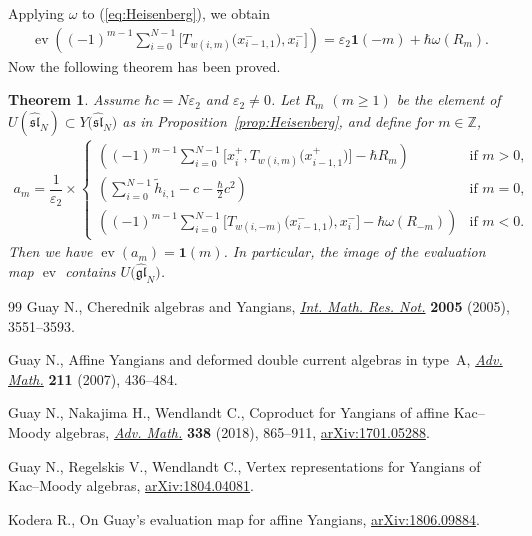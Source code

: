 \documentclass[11pt]{article}
\newtheorem{thm}{Theorem}[section]
\theoremstyle{definition}
\numberwithin{equation}{section}
\DeclareMathOperator{\ev}{ev}
\newcommand{\ve}{\varepsilon}
\newcommand{\bbZ}{\mathbb{Z}}
\newcommand{\affY}{Y\big(\affsl\big)}
\newcommand{\gl}{\mathfrak{gl}}
\newcommand{\affsl}{\hat{\mathfrak{sl}}_N}
\newcommand{\bfid}{\mathbf{1}}
\begin{document}
Applying $\omega$ to (\ref{eq:Heisenberg}), we obtain
\begin{gather*}
\ev\left( (-1)^{m-1} \sum_{i=0}^{N-1} \big[T_{w(i,m)}\big(x_{i-1,1}^-\big), x_{i}^-\big] \right) = \ve_2 \bfid(-m) + \hbar \omega(R_m).
\end{gather*}
Now the following theorem has been proved.
\begin{thm}\label{thm:image}Assume $\hbar c =N\ve_2$ and $\ve_2 \neq 0$. Let $R_m$ $(m \geq 1)$ be the element of $U(\hat{\mathfrak{sl}}_N) \subset \affY$ as in Proposition~{\rm \ref{prop:Heisenberg}}, and define for $m \in \bbZ$,
\begin{gather*}
a_{m} = \dfrac{1}{\ve_2} \times \begin{cases}
\displaystyle \left( (-1)^{m-1} \sum_{i=0}^{N-1} \big[x_{i}^+, T_{w(i,m)}\big(x_{i-1,1}^+\big)\big] - \hbar R_m\right) & \text{if $m>0$},\\
\displaystyle \left( \sum_{i=0}^{N-1} \tilde{h}_{i,1} - c - \tfrac{\hbar}{2} c^2\right) & \text{if $m=0$},\\
\displaystyle \left((-1)^{m-1} \sum_{i=0}^{N-1} \big[T_{w(i,-m)}\big(x_{i-1,1}^-\big),x_{i}^-\big] - \hbar \omega(R_{-m})\right) & \text{if $m<0$}.
\end{cases}
\end{gather*}
Then we have $\ev(a_m) = \bfid(m)$. In particular, the image of the evaluation map $\ev$ contains $U\big(\hat{\gl}_N\big)$.
\end{thm}
\begin{thebibliography}{99}
Guay N., Cherednik algebras and {Y}angians, \href{https://doi.org/10.1155/IMRN.2005.3551}{\textit{Int. Math. Res. Not.}}
 \textbf{2005} (2005), 3551--3593.

Guay N., Affine {Y}angians and deformed double current algebras in type~{A},
 \href{https://doi.org/10.1016/j.aim.2006.08.007}{\textit{Adv. Math.}} \textbf{211} (2007), 436--484.

Guay N., Nakajima H., Wendlandt C., Coproduct for {Y}angians of affine
 {K}ac--{M}oody algebras, \href{https://doi.org/10.1016/j.aim.2018.09.013}{\textit{Adv. Math.}} \textbf{338} (2018), 865--911,
 \href{https://arxiv.org/abs/1701.05288}{arXiv:1701.05288}.

Guay N., Regelskis V., Wendlandt C., Vertex representations for {Y}angians of
 {K}ac--{M}oody algebras, \href{https://arxiv.org/abs/1804.04081}{arXiv:1804.04081}.

Kodera R., On Guay's evaluation map for affine {Y}angians, \href{https://arxiv.org/abs/1806.09884}{arXiv:1806.09884}.

\end{thebibliography}
\end{document}
